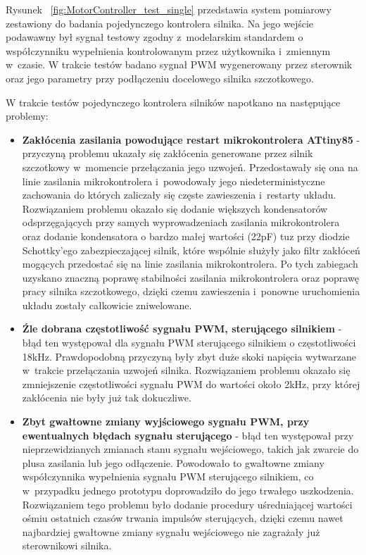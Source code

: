 Rysunek ~\ref{fig:MotorController_test_single} przedstawia system pomiarowy zestawiony do badania pojedynczego kontrolera silnika. Na jego wejście podawawny był sygnał testowy zgodny z~modelarskim standardem o współczynniku wypełnienia kontrolowanym przez użytkownika i~zmiennym w~czasie. W trakcie testów badano sygnał PWM wygenerowany przez sterownik oraz jego parametry przy podłączeniu docelowego silnika szczotkowego.

W trakcie testów pojedynczego kontrolera silników napotkano na następujące problemy:
\begin{itemize}
	\item \textbf{Zakłócenia zasilania powodujące restart mikrokontrolera ATtiny85} - przyczyną problemu ukazały się zakłócenia generowane przez silnik szczotkowy w~momencie przełączania jego uzwojeń. Przedostawały się ona na linie zasilania mikrokontrolera i~powodowały jego niedeterministyczne zachowania do których zaliczały się częste zawieszenia i~restarty układu. Rozwiązaniem problemu okazało się dodanie większych kondensatorów odsprzęgających przy samych wyprowadzeniach zasilania mikrokontrolera oraz dodanie kondensatora o bardzo małej wartości (22pF) tuz przy diodzie Schottky'ego zabezpieczającej silnik, które wspólnie służyły jako  filtr zakłóceń mogących przedostać się na linie zasilania mikrokontrolera. Po tych zabiegach uzyskano znaczną poprawę stabilności zasilania mikrokontrolera oraz poprawę pracy silnika szczotkowego, dzięki czemu zawieszenia i~ponowne uruchomienia układu zostały całkowicie zniwelowane.
	\item \textbf{Źle dobrana częstotliwość sygnału PWM, sterującego silnikiem} - błąd ten występował dla sygnału PWM sterującego silnikiem o częstotliwości 18kHz. Prawdopodobną przyczyną były zbyt duże skoki napięcia wytwarzane w~trakcie przełączania uzwojeń silnika. Rozwiązaniem problemu okazało się zmniejszenie częstotliwości sygnału PWM do wartości około 2kHz, przy której zakłócenia nie były już tak dokuczliwe.
	\item \textbf{Zbyt gwałtowne zmiany wyjściowego sygnału PWM, przy ewentualnych błędach sygnału sterującego} - błąd ten występował przy nieprzewidzianych zmianach stanu sygnału wejściowego, takich jak zwarcie do plusa zasilania lub jego odłączenie. Powodowało to gwałtowne zmiany współczynnika wypełnienia sygnału PWM sterującego silnikiem, co w~przypadku jednego prototypu doprowadziło do jego trwałego uszkodzenia. Rozwiązaniem tego problemu było dodanie procedury uśredniającej wartości ośmiu ostatnich czasów trwania impulsów sterujących, dzięki czemu nawet najbardziej gwałtowne zmiany sygnału wejściowego nie zagrażały już sterownikowi silnika.
\end{itemize}

